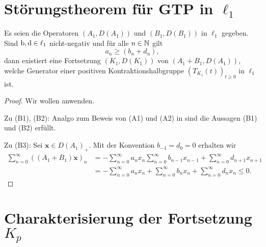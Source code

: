\section{Störungstheorem für GTP in $\ell_1$}

\begin{fsatz}
Es seien die Operatoren  $(A_1, D(A_1))$ und  $(B_1, D(B_1))$ in $\ell_1$ gegeben. Sind $\textbf{\textnormal{b}},\textbf{\textnormal{d}}\in \ell_1$ nicht-negativ und für alle $n\in\mathbb{N}$ gilt 
\begin{equation*}
a_n\geq (b_n + d_n),
\end{equation*}
dann existiert eine Fortsetzung $(K_1, D(K_1))$ von $(A_1+B_1, D(A_1))$, welche Generator einer positiven Kontraktionshalbgruppe $(T_{K_1}(t))_{t\geq0}$ in $\ell_1$ ist.
\end{fsatz}

\begin{proof}
\par
Wir wollen  anwenden.

\par
Zu (B1), (B2): Analgo zum Beweis von (A1) und (A2) in  sind die Aussagen (B1) und (B2)  erfüllt.

\par
Zu (B3): Sei $\textbf{x}\in D(A_1)_+$. Mit der Konvention $b_{-1}=d_0=0$ erhalten wir
\begin{align*}
\sum_{n=0}^\infty ((A_1+B_1)\textbf{x})_n
&= -\sum_{n=0}^\infty a_n x_n \sum_{n=0}^\infty b_{n-1}x_{n-1}+\sum_{n=0}^\infty d_{n+1}x_{n+1}\\
&=-\sum_{n=0}^\infty a_n x_n + \sum_{n=0}^\infty b_n x_n+\sum_{n=0}^\infty d_n x_n\leq 0.
\end{align*}
\end{proof}



\section{Charakterisierung der Fortsetzung $K_p$}

